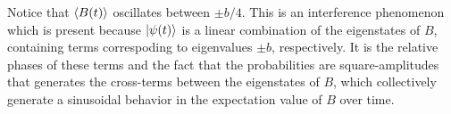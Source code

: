 {Notice that $\expval{B(t)}$ oscillates between $\pm b/4$.
This is an interference phenomenon which is present because $\ket{\psi(t)}$ is a linear combination of the eigenstates of $B$, containing terms correspoding to eigenvalues $\pm b$, respectively.
It is the relative phases of these terms and the fact that the probabilities are square-amplitudes that generates the cross-terms between the eigenstates of $B$, which collectively generate a sinusoidal behavior in the expectation value of $B$ over time.

}



